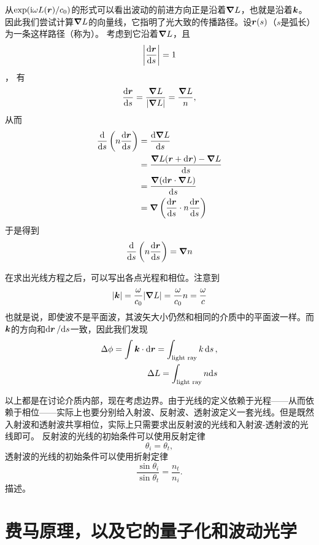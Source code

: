 从$\exp (\mathrm{i} \omega L(\vb*{r}) / c_0)$的形式可以看出波动的前进方向正是沿着$\grad{L}$，也就是沿着$\vb*{k}$。
因此我们尝试计算$\grad{L}$的向量线，它指明了光大致的传播路径。设$\vb*{r}(s)$（$s$是弧长）为一条这样路径（称为）。
考虑到它沿着$\grad{L}$，且
\[
    \abs{\dv{\vb*{r}}{s}} = 1
\]，
有
\[
    \dv{\vb*{r}}{s} = \frac{\grad{L}}{\abs{\grad{L}}} = \frac{\grad{L}}{n},
\]
从而
\[
    \begin{aligned}
        \dv{s}\left(n \dv{\vb*{r}}{s}\right) &= \dv{\grad{L}}{s} \\
        &= \frac{\grad{L}(\vb*{r} + \dd \vb*{r}) - \grad{L}}{\dd s} \\
        &= \frac{\grad{(\dd \vb*{r} \cdot \grad{L})}}{\dd s} \\
        &= \grad{\left( \dv{\vb*{r}}{s} \cdot n \dv{\vb*{r}}{s} \right)}
    \end{aligned}
\]
于是得到
\begin{equation}
    \dv{s} \left( n \dv{\vb*{r}}{s} \right) = \grad{n}
    \label{eq:light-ray}
\end{equation}

在求出光线方程之后，可以写出各点光程和相位。注意到
\[
    \abs{\vb*{k}} = \frac{\omega}{c_0} \abs{\grad{L}} = \frac{\omega}{c_0} n = \frac{\omega}{c}
\]
也就是说，即使波不是平面波，其波矢大小仍然和相同的介质中的平面波一样。而$\vb*{k}$的方向和$\dd{\vb*{r}} / \dd s$一致，因此我们发现
\begin{equation}
    \begin{aligned}
        \Delta \phi = \int \vb*{k} \cdot \dd{\vb*{r}} = \int_\text{light ray} k \dd{s}, \\
        \Delta L = \int_\text{light ray} n \dd s
    \end{aligned}
    \label{eq:light-ray-and-phrase}
\end{equation}

以上都是在讨论介质内部，现在考虑边界。由于光线的定义依赖于光程——从而依赖于相位——实际上也要分别给入射波、反射波、透射波定义一套光线。但是既然入射波和透射波共享相位，实际上只需要求出反射波的光线和入射波-透射波的光线即可。
反射波的光线的初始条件可以使用反射定律
\[
    \theta_i = \theta_t,
\]
透射波的光线的初始条件可以使用折射定律
\[
    \frac{\sin \theta_i}{\sin \theta_t} = \frac{n_t}{n_i}.
\]
描述。

\section{费马原理，以及它的量子化和波动光学}

